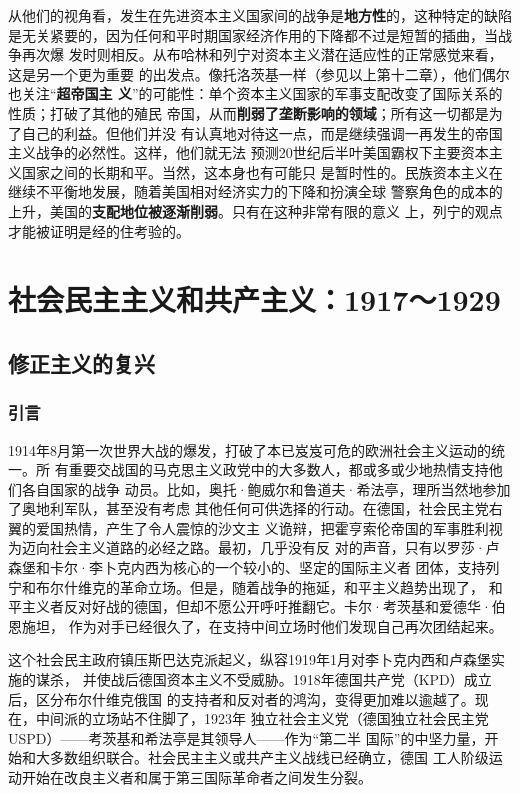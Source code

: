 从他们的视角看，发生在先进资本主义国家间的战争是\textbf{地方性}的，这种特定的缺陷
是无关紧要的，因为任何和平时期国家经济作用的下降都不过是短暂的插曲，当战争再次爆
发时则相反。从布哈林和列宁对资本主义潜在适应性的正常感觉来看，这是另一个更为重要
的出发点。像托洛茨基一样（参见以上第十二章），他们偶尔也关注“\textbf{超帝国主
  义}”的可能性：单个资本主义国家的军事支配改变了国际关系的性质；打破了其他的殖民
帝国，从而\textbf{削弱了垄断影响的领域}；所有这一切都是为了自己的利益。但他们并没
有认真地对待这一点，而是继续强调一再发生的帝国主义战争的必然性。这样，他们就无法
预测20世纪后半叶美国霸权下主要资本主义国家之间的长期和平。当然，这本身也有可能只
是暂时性的。民族资本主义在继续不平衡地发展，随着美国相对经济实力的下降和扮演全球
警察角色的成本的上升，美国的\textbf{支配地位被逐渐削弱}。只有在这种非常有限的意义
上，列宁的观点才能被证明是经的住考验的。

\part{社会民主主义和共产主义：1917～1929}

\chapter{修正主义的复兴}

\section{引言}

1914年8月第一次世界大战的爆发，打破了本已岌岌可危的欧洲社会主义运动的统一。所
有重要交战国的马克思主义政党中的大多数人，都或多或少地热情支持他们各自国家的战争
动员。比如，奥托·鲍威尔和鲁道夫·希法亭，理所当然地参加了奥地利军队，甚至没有考虑
其他任何可供选择的行动。在德国，社会民主党右翼的爱国热情，产生了令人震惊的沙文主
义诡辩，把霍亨索伦帝国的军事胜利视为迈向社会主义道路的必经之路。最初，几乎没有反
对的声音，只有以罗莎·卢森堡和卡尔·李卜克内西为核心的一个较小的、坚定的国际主义者
团体，支持列宁和布尔什维克的革命立场。但是，随着战争的拖延，和平主义趋势出现了，
和平主义者反对好战的德国，但却不愿公开呼吁推翻它。卡尔·考茨基和爱德华·伯恩施坦，
作为对手已经很久了，在支持中间立场时他们发现自己再次团结起来。

这个社会民主政府镇压斯巴达克派起义，纵容1919年1月对李卜克内西和卢森堡实施的谋杀，
并使战后德国资本主义不受威胁。1918年德国共产党（KPD）成立后，区分布尔什维克俄国
的支持者和反对者的鸿沟，变得更加难以逾越了。现在，中间派的立场站不住脚了，1923年
独立社会主义党（德国独立社会民主党USPD）——考茨基和希法亭是其领导人——作为“第二半
国际”的中坚力量，开始和大多数组织联合。社会民主主义或共产主义战线已经确立，德国
工人阶级运动开始在改良主义者和属于第三国际革命者之间发生分裂。

